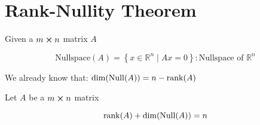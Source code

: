 \section{Rank-Nullity Theorem}

\begin{definition}
	Given a $m \cross n$ matrix $A$

	\begin{equation} \label{eq:nullspace}
		\mathrm{Nullspace}(A) = \left\{x \in \mathbb{R}^n \mid Ax = 0\right\} : \text{Nullspace of } \mathbb{R}^n
	\end{equation}

	We already know that: $\dim(\mathrm{Null}(A)) = n - \rank(A)$
\end{definition}

\begin{theorem}
	Let $A$ be a $m \cross n$ matrix

	\begin{equation} \label{eq:rank-nullity}
		\rank(A) + \dim(\mathrm{Null}(A)) = n
	\end{equation}
\end{theorem}